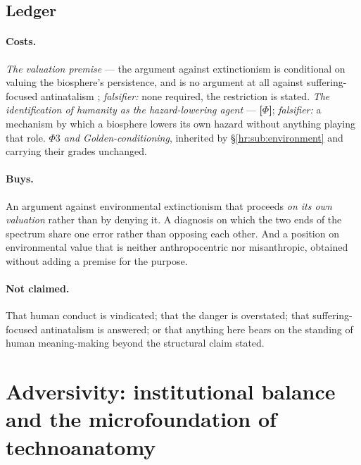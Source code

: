 \documentclass[11pt]{article}
\numberwithin{equation}{section}
\theoremstyle{plain}
\theoremstyle{definition}
\theoremstyle{remark}
\begin{document}
\subsection{Ledger}\label{hr:sub:ledger}

\paragraph{Costs.} \emph{The valuation premise} --- the argument against
extinctionism is conditional on valuing the biosphere's persistence, and
is no argument at all against suffering-focused antinatalism
\cite{Benatar06}; \emph{falsifier:} none required, the restriction is
stated. \emph{The identification of humanity as the hazard-lowering
agent} --- \textbf{[$\Phi$]}; \emph{falsifier:} a mechanism by which a
biosphere lowers its own hazard without anything playing that role.
\emph{$\Phi3$ and Golden-conditioning}, inherited by
\S\ref{hr:sub:environment} and carrying their grades unchanged.

\paragraph{Buys.} An argument against environmental extinctionism that
proceeds \emph{on its own valuation} rather than by denying it. A
diagnosis on which the two ends of the spectrum share one error rather
than opposing each other. And a position on environmental value that is
neither anthropocentric nor misanthropic, obtained without adding a
premise for the purpose.

\paragraph{Not claimed.} That human conduct is vindicated; that the
danger is overstated; that suffering-focused antinatalism is answered;
or that anything here bears on the standing of human meaning-making
beyond the structural claim stated.

\section[Adversivity and the microfoundation of technoanatomy]{Adversivity:
institutional balance and the microfoundation of technoanatomy}\label{ad:sec}
\end{document}
